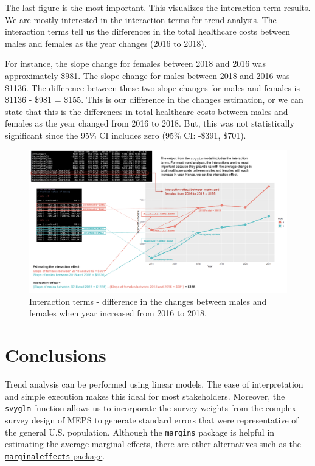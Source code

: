 \documentclass[
]{book}
\begin{document}
The last figure is the most important. This visualizes the interaction term results. We are mostly interested in the interaction terms for trend analysis. The interaction terms tell us the differences in the total healthcare costs between males and females as the year changes (2016 to 2018).

For instance, the slope change for females between 2018 and 2016 was approximately \$981. The slope change for males between 2018 and 2016 was \$1136. The difference between these two slope changes for males and females is \$1136 - \$981 = \$155. This is our difference in the changes estimation, or we can state that this is the differences in total healthcare costs between males and females as the year changed from 2016 to 2018. But, this was not statistically significant since the 95\% CI includes zero (95\% CI: -\$391, \$701).

\begin{figure}
\includegraphics[width=1\linewidth]{Figure 5_4} \caption{Interaction terms - difference in the changes between males and females when year increased from 2016 to 2018.}\label{fig:unnamed-chunk-80}
\end{figure}

\hypertarget{conclusions-4}{%
\section{Conclusions}\label{conclusions-4}}

Trend analysis can be performed using linear models. The ease of interpretation and simple execution makes this ideal for most stakeholders. Moreover, the \texttt{svyglm} function allows us to incorporate the survey weights from the complex survey design of MEPS to generate standard errors that were representative of the general U.S. population. Although the \texttt{margins} package is helpful in estimating the average marginal effects, there are other alternatives such as the \href{https://github.com/vincentarelbundock/marginaleffects}{\texttt{marginaleffects} package}.
\end{document}

